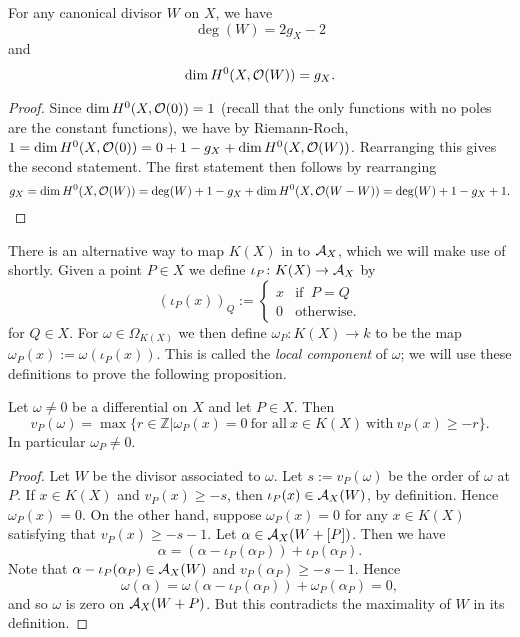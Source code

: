 \begin{cor}\label{dim=gc}
 For any canonical divisor $W$ on $X$, we have 
 \[
  \deg(W) = 2g_X-2
 \]
and \[
     \dim H^0(X,{\cal O}(W)) = g_X.
    \]
\end{cor}
\begin{proof}
Since $\dim H^0(X,{\cal O}(0)) = 1$ (recall that the only functions with no poles are the constant functions), we have by Riemann-Roch, $ 1= \dim H^0(X,{\cal O}(0)) = 0 + 1 -g_X + \dim H^0(X,{\cal O}(W))$.
 Rearranging this gives the second statement.
 The first statement then follows by rearranging
\[
 g_X = \dim H^0(X,{\cal O}(W)) = \deg(W) + 1 -g_X +  \dim H^0(X,{\cal O}(W-W))= \deg(W) + 1 -g_X + 1.
\]
\end{proof}


There is an alternative way to map $K(X)$ in to ${\mathcal A}_X$, which we will make use of shortly.
Given a point $P\in X$ we define $\iota_P\colon K(X) \rightarrow {\mathcal A}_X$ by
\begin{equation}
 (\iota_P(x))_Q:= \begin{cases}
           x & \text{if }\ P=Q\\
           0 & \text{otherwise}.
           \end{cases}
\end{equation}
for $Q\in X$.
For $\omega \in \Omega_{K(X)}$ we then define $\omega_P\colon K(X) \rightarrow k$ to be the map $\omega_P(x) := \omega(\iota_P(x))$.
This is called the {\em local component} of $\omega$; we will use these definitions to prove the following proposition.\\

\begin{prop}\label{propertyofomega}
 Let $\omega \neq 0$ be a differential on $X$ and let $P\in X$. Then
 \[
  v_P(\omega) = \max \{r\in \mathbb{Z}|\omega_P(x) = 0\ \text{for all} \ x\in K(X) \ \text{with}\ v_P(x) \geq -r\}.
 \]
In particular $\omega_P \neq 0$.
\end{prop}
\begin{proof}
 Let $W$ be the divisor associated to $\omega$.
 Let $s:=v_P(\omega)$ be the order of $\omega$ at $P$.
 If $x\in K(X)$ and $v_P(x)\geq -s$, then $\iota_P(x) \in {\mathcal A}_X(W)$, by definition.
 Hence $\omega_P(x) = 0$.
 On the other hand, suppose $\omega_P(x) = 0$ for any $x\in K(X)$ satisfying that $v_P(x) \geq -s-1$.
 Let $\alpha\in {\mathcal A}_X(W+[P])$.
 Then we have
 \[
  \alpha = (\alpha-\iota_P(\alpha_P)) + \iota_P(\alpha_P).
 \]
Note that $\alpha - \iota_P(\alpha_P)\in {\mathcal A}_X(W)$ and $v_P(\alpha_P) \geq -s-1$.
Hence
\[
 \omega(\alpha) = \omega(\alpha-\iota_P(\alpha_P))  + \omega_P(\alpha_P) = 0,
\]
and so $\omega$ is zero on ${\mathcal A}_X(W+P)$.
But this contradicts the maximality of $W$ in its definition.
 
\end{proof}



